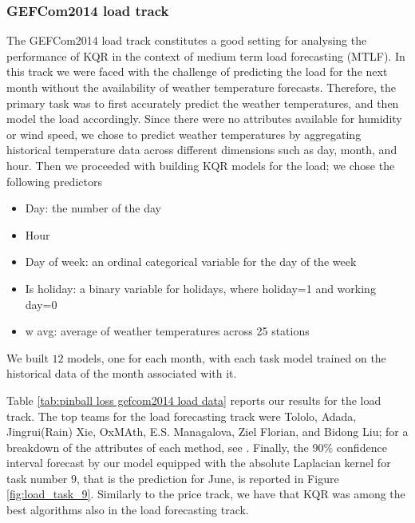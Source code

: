 \subsubsection{GEFCom2014 load track} 
The GEFCom2014 load track constitutes a good setting for analysing the performance of KQR in the context of medium term load forecasting (MTLF).
In this track we were faced with the challenge of predicting the load for the next month without the availability of weather temperature forecasts. 
Therefore, the primary task was to first accurately predict the weather temperatures, and then model the load accordingly. Since there were no attributes available for humidity or wind speed, we chose to predict weather temperatures by aggregating historical temperature data across different dimensions such as day, month, and hour. Then we proceeded with building KQR models for the load; we chose the following predictors
\begin{itemize}
    \item Day: the number of the day
    \item Hour
    \item Day of week: an ordinal categorical variable for the day of the week
    \item Is holiday: a binary variable for holidays, where holiday=1 and working day=0
    \item w avg: average of weather temperatures across 25 stations
\end{itemize}
We built $12$ models, one for each month, with each task model trained on the historical data of the month associated with it.

Table \ref{tab:pinball loss gefcom2014 load data} reports our results for the load track. The top teams for the load forecasting track were Tololo, Adada, Jingrui(Rain) Xie, OxMAth, E.S. Managalova, Ziel Florian, and Bidong Liu; for a breakdown of the attributes of each method, see \cite[Table 6]{hong2016probabilistic}.
Finally, the $90\%$ confidence interval forecast by our model equipped with the absolute Laplacian kernel for task number $9$, that is the prediction for June, is reported in Figure \ref{fig:load_task_9}.
Similarly to the price track, we have that KQR was among the best algorithms also in the load forecasting track.

